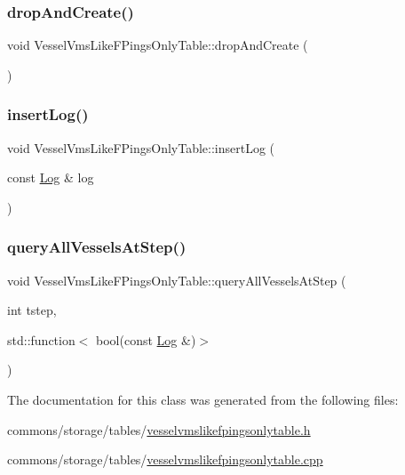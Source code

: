 \subsubsection{\texorpdfstring{dropAndCreate()}{dropAndCreate()}}
{\footnotesize\ttfamily void Vessel\+Vms\+Like\+F\+Pings\+Only\+Table\+::drop\+And\+Create (\begin{DoxyParamCaption}{ }\end{DoxyParamCaption})}

\mbox{\label{class_vessel_vms_like_f_pings_only_table_aa320f841cb6c3b1cfcf7a44c6cc80382}} 
\subsubsection{\texorpdfstring{insertLog()}{insertLog()}}
{\footnotesize\ttfamily void Vessel\+Vms\+Like\+F\+Pings\+Only\+Table\+::insert\+Log (\begin{DoxyParamCaption}\item[{const \mbox{\hyperlink{struct_vessel_vms_like_f_pings_only_table_1_1_log}{Log}} \&}]{log }\end{DoxyParamCaption})}

\mbox{\label{class_vessel_vms_like_f_pings_only_table_aafe4870a8bc05728b97403eb7fb5f982}} 
\subsubsection{\texorpdfstring{queryAllVesselsAtStep()}{queryAllVesselsAtStep()}}
{\footnotesize\ttfamily void Vessel\+Vms\+Like\+F\+Pings\+Only\+Table\+::query\+All\+Vessels\+At\+Step (\begin{DoxyParamCaption}\item[{int}]{tstep,  }\item[{std\+::function$<$ bool(const \mbox{\hyperlink{struct_vessel_vms_like_f_pings_only_table_1_1_log}{Log}} \&)$>$}]{ }\end{DoxyParamCaption})}



The documentation for this class was generated from the following files\+:\begin{DoxyCompactItemize}
\item 
commons/storage/tables/\mbox{\hyperlink{vesselvmslikefpingsonlytable_8h}{vesselvmslikefpingsonlytable.\+h}}\item 
commons/storage/tables/\mbox{\hyperlink{vesselvmslikefpingsonlytable_8cpp}{vesselvmslikefpingsonlytable.\+cpp}}\end{DoxyCompactItemize}
